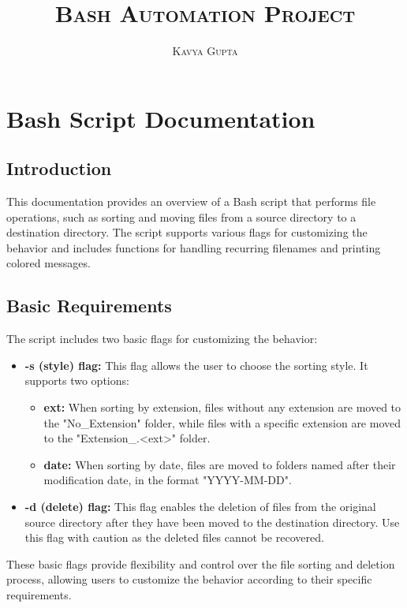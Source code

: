 \documentclass{article}
\title{\textsc{Bash Automation Project}}
\author{\textsc{Kavya Gupta}}
\begin{document}
\maketitle
\section{Bash Script Documentation}

\subsection{Introduction}
This documentation provides an overview of a Bash script that performs file operations, such as sorting and moving files from a source directory to a destination directory. The script supports various flags for customizing the behavior and includes functions for handling recurring filenames and printing colored messages.

\subsection{Basic Requirements}

The script includes two basic flags for customizing the behavior:

\begin{itemize}
  \item \textbf{-s (style) flag:} This flag allows the user to choose the sorting style. It supports two options:
    \begin{itemize}
      \item \textbf{ext:} When sorting by extension, files without any extension are moved to the "No\_Extension" folder, while files with a specific extension are moved to the "Extension\_.<ext>" folder.
      \item \textbf{date:} When sorting by date, files are moved to folders named after their modification date, in the format "YYYY-MM-DD".
    \end{itemize}
  \item \textbf{-d (delete) flag:} This flag enables the deletion of files from the original source directory after they have been moved to the destination directory. Use this flag with caution as the deleted files cannot be recovered.
\end{itemize}

These basic flags provide flexibility and control over the file sorting and deletion process, allowing users to customize the behavior according to their specific requirements.
\end{document}
